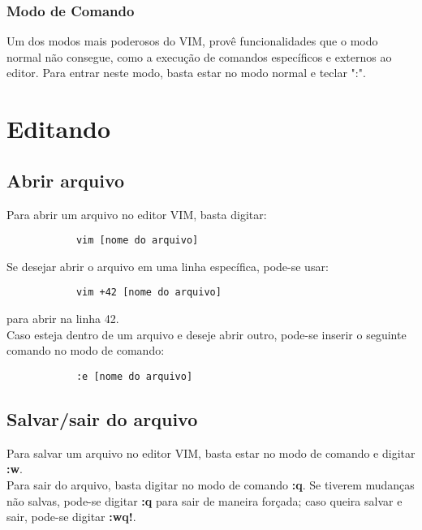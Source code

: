 \documentclass[12pt]{article}
\begin{document}
		\subsubsection{Modo de Comando}
		Um dos modos mais poderosos do VIM, provê funcionalidades que o modo normal não consegue, como a execução de comandos específicos e externos ao editor. Para entrar neste modo, basta estar no modo normal e teclar ":". 
	\newpage

	\section{Editando}
		\subsection{Abrir arquivo}
		Para abrir um arquivo no editor VIM, basta digitar:
		\begin{lstlisting}
			vim [nome do arquivo]
		\end{lstlisting}
		Se desejar abrir o arquivo em uma linha específica, pode-se usar:
		\begin{lstlisting}
			vim +42 [nome do arquivo]
		\end{lstlisting}
		para abrir na linha 42. \\
		Caso esteja dentro de um arquivo e deseje abrir outro, pode-se inserir o seguinte comando no modo de comando:
		\begin{lstlisting}
			:e [nome do arquivo]
		\end{lstlisting} 
		\subsection{Salvar/sair do arquivo}
		Para salvar um arquivo no editor VIM, basta estar no modo de comando e digitar \textbf{:w}. \\
		Para sair do arquivo, basta digitar no modo de comando \textbf{:q}. Se tiverem mudanças não salvas, pode-se digitar \textbf{:q} para sair de maneira forçada; caso queira salvar e sair, pode-se digitar \textbf{:wq!}. 
\end{document}
